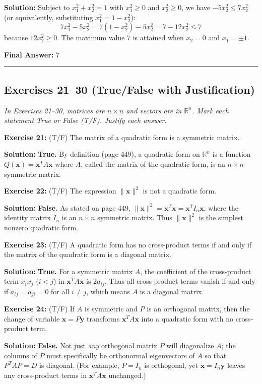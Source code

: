 \documentclass[11pt, letterpaper]{article}
\theoremstyle{definition}
\theoremstyle{remark}
\begin{document}
\textbf{Solution:}
Subject to $x_1^2 + x_2^2 = 1$ with $x_1^2 \ge 0$ and $x_2^2 \ge 0$, we have $-5x_2^2 \le 7x_2^2$ (or equivalently, substituting $x_1^2 = 1 - x_2^2$):
\[
7x_1^2 - 5x_2^2 = 7(1 - x_2^2) - 5x_2^2 = 7 - 12x_2^2 \le 7
\]
because $12x_2^2 \ge 0$. The maximum value $7$ is attained when $x_2 = 0$ and $x_1 = \pm 1$.

\textbf{Final Answer:} $7$

\medskip\hrule\medskip

\subsection*{Exercises 21--30 (True/False with Justification)}
\textit{In Exercises 21--30, matrices are $n \times n$ and vectors are in $\mathbb{R}^n$. Mark each statement True or False (T/F). Justify each answer.}

\textbf{Exercise 21:} (T/F) The matrix of a quadratic form is a symmetric matrix.

\textbf{Solution:} \textbf{True.} By definition (page 449), a quadratic form on $\mathbb{R}^n$ is a function $Q(\mathbf{x}) = \mathbf{x}^T A \mathbf{x}$ where $A$, called the matrix of the quadratic form, is an $n \times n$ symmetric matrix.

\medskip
\textbf{Exercise 22:} (T/F) The expression $\|\mathbf{x}\|^2$ is not a quadratic form.

\textbf{Solution:} \textbf{False.} As stated on page 449, $\|\mathbf{x}\|^2 = \mathbf{x}^T \mathbf{x} = \mathbf{x}^T I_n \mathbf{x}$, where the identity matrix $I_n$ is an $n \times n$ symmetric matrix. Thus $\|\mathbf{x}\|^2$ is the simplest nonzero quadratic form.

\medskip
\textbf{Exercise 23:} (T/F) A quadratic form has no cross-product terms if and only if the matrix of the quadratic form is a diagonal matrix.

\textbf{Solution:} \textbf{True.} For a symmetric matrix $A$, the coefficient of the cross-product term $x_i x_j$ ($i < j$) in $\mathbf{x}^T A \mathbf{x}$ is $2a_{ij}$. Thus all cross-product terms vanish if and only if $a_{ij} = a_{ji} = 0$ for all $i \neq j$, which means $A$ is a diagonal matrix.

\medskip
\textbf{Exercise 24:} (T/F) If $A$ is symmetric and $P$ is an orthogonal matrix, then the change of variable $\mathbf{x} = P\mathbf{y}$ transforms $\mathbf{x}^T A \mathbf{x}$ into a quadratic form with no cross-product term.

\textbf{Solution:} \textbf{False.} Not just \textit{any} orthogonal matrix $P$ will diagonalize $A$; the columns of $P$ must specifically be orthonormal eigenvectors of $A$ so that $P^T A P = D$ is diagonal. (For example, $P = I_n$ is orthogonal, yet $\mathbf{x} = I_n \mathbf{y}$ leaves any cross-product terms in $\mathbf{x}^T A \mathbf{x}$ unchanged.)
\end{document}
